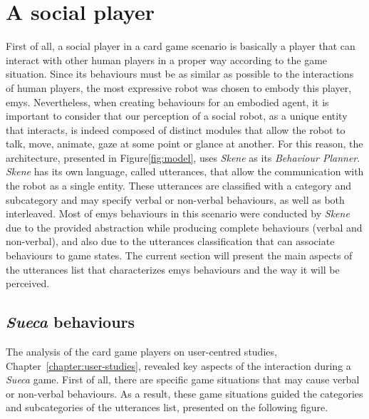 \section{A social player}
\label{sec:social-player}

First of all, a social player in a card game scenario is basically a player that can interact with other human players in a proper way according to the game situation.
Since its behaviours must be as similar as possible to the interactions of human players, the most expressive robot was chosen to embody this player, \ac{emys}.
Nevertheless, when creating behaviours for an embodied agent, it is important to consider that our perception of a social robot, as a unique entity that interacts, is indeed composed of distinct modules that allow the robot to talk, move, animate, gaze at some point or glance at another.
For this reason, the architecture, presented in Figure\ref{fig:model}, uses \emph{Skene} as its \emph{Behaviour Planner}.
\emph{Skene} has its own language, called utterances, that allow the communication with the robot as a single entity.
These utterances are classified with a category and subcategory and may specify verbal or non-verbal behaviours, as well as both interleaved.
Most of \ac{emys} behaviours in this scenario were conducted by \emph{Skene} due to the provided abstraction while producing complete behaviours (verbal and non-verbal), and also due to the utterances classification that can associate behaviours to game states.
The current section will present the main aspects of the utterances list that characterizes \ac{emys} behaviours and the way it will be perceived.



\subsection{\emph{Sueca} behaviours}
The analysis of the card game players on user-centred studies, Chapter~\ref{chapter:user-studies}, revealed key aspects of the interaction during a \emph{Sueca} game.
First of all, there are specific game situations that may cause verbal or non-verbal behaviours.
As a result, these game situations guided the categories and subcategories of the utterances list, presented on the following figure.

